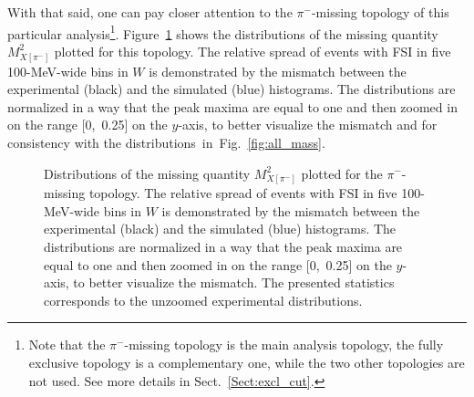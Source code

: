 With that said, one can pay closer attention to the $\pi^{-}$-missing topology of this particular analysis\footnote[9]{Note that the $\pi^{-}$-missing topology is the main analysis topology, the fully exclusive topology is a complementary one, while the two other topologies are not used. See more details in Sect.~\ref{Sect:excl_cut}.}. Figure~\ref{fig:main_top} shows the distributions of the missing quantity $M^{2}_{X[\pi^{-}]}$ plotted for this topology. The relative spread of events with FSI in five 100-MeV-wide bins in $W$ is demonstrated by the mismatch between the experimental (black) and the simulated (blue) histograms. The distributions are normalized in a way that the peak maxima are equal to one and then zoomed in on the range [0,~0.25] on the $y$-axis, to better visualize the mismatch and for consistency with the distributions~in~Fig.~\ref{fig:all_mass}.
\begin{figure}[!ht]
\begin{center}
\end{center}
\caption{\small Distributions of the missing quantity $M^{2}_{X[\pi^{-}]}$ plotted for the $\pi^{-}$-missing topology. The relative spread of events with FSI in five 100-MeV-wide bins in $W$ is demonstrated by the mismatch between the experimental (black) and the simulated (blue) histograms. The distributions are normalized in a way that the peak maxima are equal to one and then zoomed in on the range [0,~0.25] on the $y$-axis, to better visualize the mismatch. The presented statistics corresponds to the unzoomed experimental distributions.}
\label{fig:main_top}
\end{figure}

